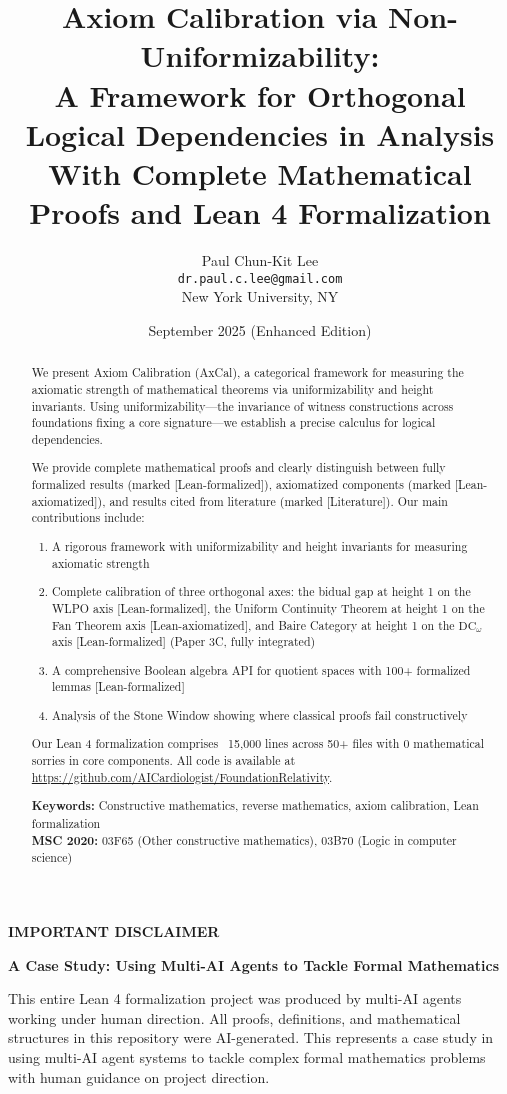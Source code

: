 \documentclass[11pt]{article}
\title{Axiom Calibration via Non-Uniformizability:\\
A Framework for Orthogonal Logical Dependencies in Analysis\\
\Large{With Complete Mathematical Proofs and Lean 4 Formalization}}
\author{Paul Chun-Kit Lee\\
\texttt{dr.paul.c.lee@gmail.com}\\
New York University, NY}
\date{September 2025 (Enhanced Edition)}
\theoremstyle{plain}
\theoremstyle{definition}
\newcommand{\DCw}{\mathrm{DC}_\omega}
\newcommand{\leanok}{\textsf{\textcolor{green!70!black}{[Lean-formalized]}}}
\newcommand{\leanaxiom}{\textsf{\textcolor{orange!80!black}{[Lean-axiomatized]}}}
\newcommand{\leancited}{\textsf{\textcolor{blue!70!black}{[Literature]}}}
\begin{document}
\maketitle

\begin{abstract}
We present Axiom Calibration (AxCal), a categorical framework for measuring the axiomatic strength of mathematical theorems via uniformizability and height invariants. Using uniformizability—the invariance of witness constructions across foundations fixing a core signature—we establish a precise calculus for logical dependencies. 

We provide complete mathematical proofs and clearly distinguish between fully formalized results (marked \leanok), axiomatized components (marked \leanaxiom), and results cited from literature (marked \leancited). Our main contributions include:
\begin{enumerate}
\item A rigorous framework with uniformizability and height invariants for measuring axiomatic strength
\item Complete calibration of three orthogonal axes: the bidual gap at height 1 on the WLPO axis \leanok, the Uniform Continuity Theorem at height 1 on the Fan Theorem axis \leanaxiom, and Baire Category at height 1 on the $\DCw$ axis \leanok{} (Paper 3C, fully integrated)
\item A comprehensive Boolean algebra API for quotient spaces with 100+ formalized lemmas \leanok
\item Analysis of the Stone Window showing where classical proofs fail constructively
\end{enumerate}

Our Lean 4 formalization comprises ~15,000 lines across 50+ files with 0 mathematical sorries in core components. All code is available at \url{https://github.com/AICardiologist/FoundationRelativity}.

\vspace{0.5em}
\noindent\textbf{Keywords:} Constructive mathematics, reverse mathematics, axiom calibration, Lean formalization\\
\textbf{MSC 2020:} 03F65 (Other constructive mathematics), 03B70 (Logic in computer science)
\end{abstract}

\begin{mdframed}[backgroundcolor=gray!10, linewidth=0pt]
\textbf{IMPORTANT DISCLAIMER}

\textbf{A Case Study: Using Multi-AI Agents to Tackle Formal Mathematics}

This entire Lean 4 formalization project was produced by multi-AI agents working under human direction. All proofs, definitions, and mathematical structures in this repository were AI-generated. This represents a case study in using multi-AI agent systems to tackle complex formal mathematics problems with human guidance on project direction.
\end{mdframed}
\end{document}

